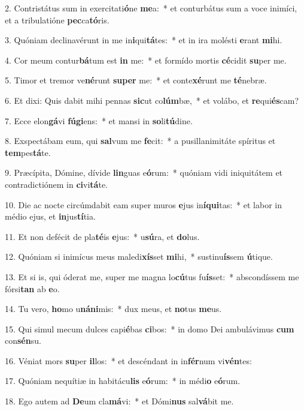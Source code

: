 2. Contristátus sum in exercitati\textbf{ó}ne \textbf{me}a:~*  et conturbátus sum a voce inimíci, et a tribulatióne \textbf{pec}ca\textbf{tó}ris.\

3. Quóniam declinavérunt in me in\textbf{i}qui\textbf{tá}tes:~*  et in ira molésti \textbf{e}rant \textbf{mi}hi.\

4. Cor meum contur\textbf{bá}tum est \textbf{in} me:~*  et formído mortis \textbf{cé}cidit \textbf{su}per me.\

5. Timor et tremor ve\textbf{né}runt \textbf{su}\textbf{per} me:~*  et conte\textbf{xé}runt me \textbf{té}nebræ.\

6. Et dixi: Quis dabit mihi pennas \textbf{sic}ut co\textbf{lúm}bæ,~*  et volábo, et \textbf{re}qui\textbf{és}cam?\

7. Ecce elon\textbf{gá}vi \textbf{fú}\textbf{gi}ens:~*  et mansi in \textbf{so}li\textbf{tú}dine.\

8. Exspectábam eum, qui \textbf{sal}vum me \textbf{fe}cit:~*  a pusillanimitáte spíritus et \textbf{tem}pes\textbf{tá}te.\

9. Præcípita, Dómine, dívide \textbf{lin}guas e\textbf{ó}rum:~*  quóniam vidi iniquitátem et contradictiónem in \textbf{ci}vi\textbf{tá}te.\

10. Die ac nocte circúmdabit eam super muros \textbf{e}jus in\textbf{í}\textbf{qui}tas:~*  et labor in médio ejus, et \textbf{in}jus\textbf{tí}tia.\

11. Et non defécit de pla\textbf{té}is \textbf{e}jus:~*  u\textbf{sú}ra, et \textbf{do}lus.\

12. Quóniam si inimícus meus maledi\textbf{xís}set \textbf{mi}hi,~*  sustinu\textbf{ís}sem \textbf{ú}tique.\

13. Et si is, qui óderat me, super me magna lo\textbf{cú}tus fu\textbf{ís}set:~*  abscondíssem me fórsi\textbf{tan} ab \textbf{e}o.\

14. Tu vero, \textbf{ho}mo u\textbf{ná}\textbf{ni}mis:~*  dux meus, et \textbf{no}tus \textbf{me}us.\

15. Qui simul mecum dulces capi\textbf{é}bas \textbf{ci}bos:~*  in domo Dei ambulávimus \textbf{cum} con\textbf{sén}su.\

16. Véniat mors \textbf{su}per \textbf{il}los:~*  et descéndant in in\textbf{fér}num vi\textbf{vén}tes:\

17. Quóniam nequítiæ in habitácu\textbf{lis} e\textbf{ó}rum:~*  in médi\textbf{o} e\textbf{ó}rum.\

18. Ego autem ad \textbf{De}um cla\textbf{má}vi:~*  et Dómi\textbf{nus} sal\textbf{vá}bit me.\

